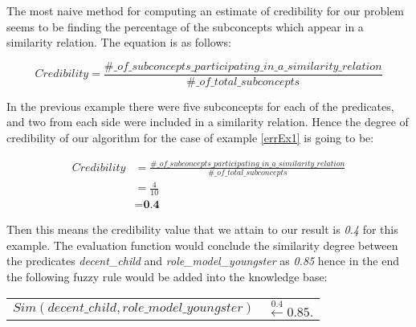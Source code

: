 \documentclass[egilmezThesis.tex]{subfiles}
\begin{document}
The most naive method for computing an estimate of credibility for our problem seems to be finding the percentage of the subconcepts which appear in a similarity relation. The equation is as follows:

\begin{comment}
\begin{equation}\label{eq:sdE3}
\begin{split}
\textit{sd} &=   (1-\lvert  \textit{$cred_{1}$} - \textit{$cred_{2}$}  \rvert) \textbf{\emph{OP}} (\frac{\sum_{i=1}^{n} vm_i}{n})\\
 &=   (1-\lvert  0.95 - 1  \rvert) . (\frac{0.9 + 0.8}{2}) \\
&\cong{\textbf{0.81}}
 \end{split} 
\end{equation}
\end{comment}

\begin{equation}
\textit{Credibility} = \frac{\#\_of\_subconcepts\_participating\_in\_a\_similarity\_relation}{\#\_of\_total\_subconcepts}
\end{equation}

In the previous example there were five subconcepts for each of the predicates, and two from each side were included in a similarity relation. Hence the degree of credibility of our algorithm for the case of example \ref{errEx1} is going to be:

\begin{equation}
\begin{split}
\textit{Credibility} &= \frac{\#\_of\_subconcepts\_participating\_in\_a\_similarity\_relation}{\#\_of\_total\_subconcepts} \\
&= \frac{4}{10} \\
&= \textbf{0.4} 
\end{split}
\end{equation}

Then this means the credibility value that we attain to our result is \textit{0.4} for this example. The evaluation function would conclude the similarity degree between the predicates \textit{decent\_child} and \textit{role\_model\_youngster} as \textit{0.85} hence in the end the following fuzzy rule would be added into the knowledge base:

\begin{tabular}{l l}
$Sim(decent\_child, role\_model\_youngster)$ & $\stackrel{0.4}{\longleftarrow} 0.85.$\\
\end{tabular}
\end{document}
